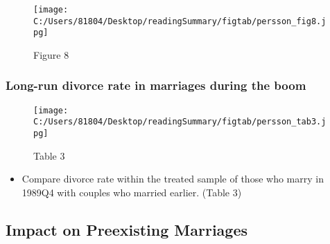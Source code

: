 \documentclass[a4paper, 12pt]{article}
\begin{document}
\begin{figure}[h!]
\center
\texttt{[image: C:/Users/81804/Desktop/readingSummary/figtab/persson\_fig8.jpg]}
\caption*{Figure 8}
\end{figure}

\subsubsection{Long-run divorce rate in marriages during the boom}

\begin{figure}[h!]
\center
\texttt{[image: C:/Users/81804/Desktop/readingSummary/figtab/persson\_tab3.jpg]}
\caption*{Table 3}
\end{figure}

\begin{itemize}
\item Compare divorce rate within the treated sample of those who marry in 1989Q4 with couples who married earlier. (Table 3)
\end{itemize}

\subsection{Impact on Preexisting Marriages}
\end{document}
